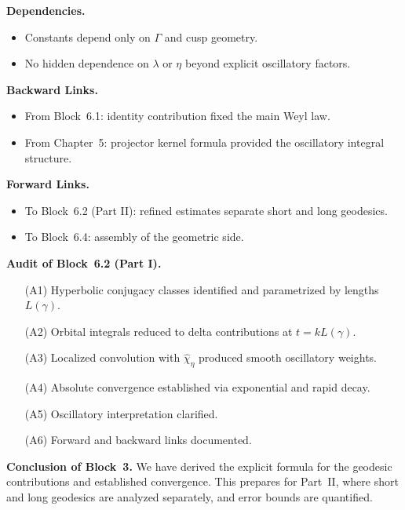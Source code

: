 \medskip

\noindent\textbf{Dependencies.}
\begin{itemize}
  \item Constants depend only on $\Gamma$ and cusp geometry.
  \item No hidden dependence on $\lambda$ or $\eta$ beyond explicit oscillatory factors.
\end{itemize}

\medskip

\noindent\textbf{Backward Links.}
\begin{itemize}
  \item From Block~6.1: identity contribution fixed the main Weyl law.
  \item From Chapter~5: projector kernel formula provided the oscillatory integral structure.
\end{itemize}

\medskip

\noindent\textbf{Forward Links.}
\begin{itemize}
  \item To Block~6.2 (Part II): refined estimates separate short and long geodesics.
  \item To Block~6.4: assembly of the geometric side.
\end{itemize}

\medskip

\noindent\textbf{Audit of Block~6.2 (Part I).}
\begin{itemize}
  \item[(A1)] Hyperbolic conjugacy classes identified and parametrized by lengths $L(\gamma)$.
  \item[(A2)] Orbital integrals reduced to delta contributions at $t=kL(\gamma)$.
  \item[(A3)] Localized convolution with $\widehat{\chi}_\eta$ produced smooth oscillatory weights.
  \item[(A4)] Absolute convergence established via exponential and rapid decay.
  \item[(A5)] Oscillatory interpretation clarified.
  \item[(A6)] Forward and backward links documented.
\end{itemize}

\medskip

\noindent\textbf{Conclusion of Block~3.}
We have derived the explicit formula for the geodesic contributions and established convergence.  
This prepares for Part~II, where short and long geodesics are analyzed separately, and error bounds are quantified.

